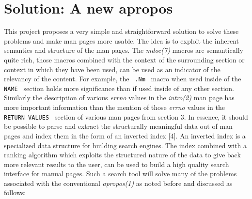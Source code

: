 \documentclass[letterpaper,twocolumn,10pt]{article}
\begin{document}
\section{Solution: A new apropos}
This project proposes a very simple and straightforward solution to solve these
problems and make man pages more usable. The idea is to exploit the inherent
semantics and structure of the man pages. The \textit{mdoc(7)}
macros are semantically quite rich, those macros combined with the context of the surrounding section or context in which they have been used, can be used
as an indicator of the relevancy of the content. For example, the
{\tt \small
.Nm
}
macro when used inside of the
{\tt \small
NAME
}
section holds more significance than if used inside of any other section. Similarly the description of various \textit{errno} values in the
\textit{intro(2)} man page has more important information than the mention of
those \textit{errno} values in the
{\tt \small
RETURN VALUES
}
section of various man pages from section 3. In essence, it should be possible
to parse and extract the structurally meaningful data
out of man pages and index them in the form of an inverted index [4]. An
inverted index is a specialized data structure for building search engines. The index combined with a ranking algorithm which exploits the structured nature of the data to give back more relevant results to the user, can be used to build a
high quality search interface for manual pages.
Such a search tool will solve many of the problems associated with the conventional \textit{apropos(1)} as noted
before and discussed as follows: \\
\end{document}
